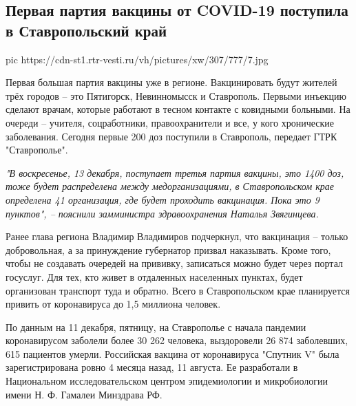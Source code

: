  
 
 
 
 
 
\subsection{Первая партия вакцины от COVID-19 поступила в Ставропольский край}
\label{sec:11_12_2020.news.ru.vesti.4.stavropol_vaccine}

\ifcmt
pic https://cdn-st1.rtr-vesti.ru/vh/pictures/xw/307/777/7.jpg
\fi

Первая большая партия вакцины уже в регионе. Вакцинировать будут жителей трёх
городов – это Пятигорск, Невинномысск и Ставрополь. Первыми инъекцию сделают
врачам, которые работают в тесном контакте с ковидными больными. На очереди –
учителя, соцработники, правоохранители и все, у кого хронические заболевания.
Сегодня первые 200 доз поступили в Ставрополь, передает ГТРК "Ставрополье".

\begin{leftbar}
	\begingroup
		\em "В воскресенье, 13 декабря, поступает третья партия вакцины, это 1400
				доз, тоже будет распределена между медорганизациями, в Ставропольском
				крае определена 41 организация, где будет проходить вакцинация. Пока
				это 9 пунктов", – пояснили замминистра здравоохранения Наталья
				Звягинцева.
	\endgroup
\end{leftbar}

Ранее глава региона Владимир Владимиров подчеркнул, что вакцинация – только
добровольная, а за принуждение губернатор призвал наказывать. Кроме того, чтобы
не создавать очередей на прививку, записаться можно будет через портал
госуслуг. Для тех, кто живет в отдаленных населенных пунктах, будет организован
транспорт туда и обратно. Всего в Ставропольском крае планируется привить от
коронавируса до 1,5 миллиона человек.

По данным на 11 декабря, пятницу, на Ставрополье с начала пандемии
коронавирусом заболели более 30 262 человека, выздоровели 26 874 заболевших,
615 пациентов умерли. Российская вакцина от коронавируса "Спутник V" была
зарегистрирована ровно 4 месяца назад, 11 августа. Ее разработали в
Национальном исследовательском центром эпидемиологии и микробиологии имени Н.
Ф. Гамалеи Минздрава РФ.
